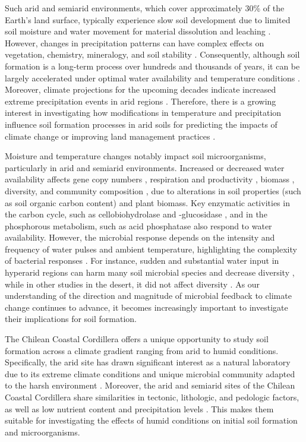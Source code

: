 Such arid and semiarid environments, which cover approximately 30\% of the Earth’s land surface, typically experience slow soil development due to limited soil moisture and water movement for material dissolution and leaching \citep{Abdelfattah2013, Sousa2021}. However, changes in precipitation patterns can have complex effects on vegetation, chemistry, mineralogy, and soil stability \citep{Su2010, Wang2017, Sousa2021}. Consequently, although soil formation is a long-term process over hundreds and thousands of years, it can be largely accelerated under optimal water availability and temperature conditions \citep{Buchan2011, Szalai2021}. Moreover, climate projections for the upcoming decades indicate increased extreme precipitation events in arid regions \citep{Donat2016, Ortega2019}. Therefore, there is a growing interest in investigating how modifications in temperature and precipitation influence soil formation processes in arid soils for predicting the impacts of climate change or improving land management practices \citep{Gelybo2018}.

Moisture and temperature changes notably impact soil microorganisms, particularly in arid and semiarid environments. Increased or decreased water availability affects gene copy numbers \citep{Barnard2013}, respiration and productivity \citep{Armstrong2016}, biomass \citep{Na2019, Ouyang2020}, diversity, and community composition \citep{Maestre2015, StovicekB2017}, due to alterations in soil properties (such as soil organic carbon content) and plant biomass. Key enzymatic activities in the carbon cycle, such as cellobiohydrolase and \textbeta-glucosidase \citep{Ouyang2020}, and in the phosphorous metabolism, such as acid phosphatase \citep{Na2019} also respond to water availability. However, the microbial response depends on the intensity and frequency of water pulses and ambient temperature, highlighting the complexity of bacterial responses \citep{StovicekA2017}. For instance, sudden and substantial water input in hyperarid regions can harm many soil microbial species and decrease diversity \citep{AzuaBustos2018}, while in other studies in the desert, it did not affect diversity \citep{Armstrong2016}. As our understanding of the direction and magnitude of microbial feedback to climate change continues to advance, it becomes increasingly important to investigate their implications for soil formation.

The Chilean Coastal Cordillera offers a unique opportunity to study soil formation across a climate gradient ranging from arid to humid conditions. Specifically, the arid site has drawn significant interest as a natural laboratory due to its extreme climate conditions and unique microbial community adapted to the harsh environment \citep{Genderjahn2018, SchulzeMakuch2018, Aguilera2021, Genderjahn2021, SchulzeMakuch2021}. Moreover, the arid and semiarid sites of the Chilean Coastal Cordillera share similarities in tectonic, lithologic, and pedologic factors, as well as low nutrient content and precipitation levels \citep{Bernhard2018, Oeser2018}. This makes them suitable for investigating the effects of humid conditions on initial soil formation and microorganisms.

